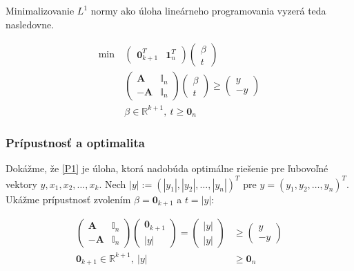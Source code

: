\documentclass[report.tex]{subfiles}
\begin{document}
Minimalizovanie $L^{1}$ normy ako úloha lineárneho programovania vyzerá teda nasledovne.

\begin{align}
	\text{min}~ &
	\left(
		\begin{array}{c|c}
			\mathbf{0}_{k+1}^T & \mathbf{1}_n^T
		\end{array}
	\right)
	\left(
		\begin{array}{c}
			\beta \\
			\hline
			t
		\end{array}
	\right) \nonumber \\
	&\left(
		\begin{array}{c|c}
			\mathbf{A} & \mathbb{I}_n \\
			\hline
			-\mathbf{A} & \mathbb{I}_n
		\end{array}
	\right)
	\left(
		\begin{array}{c}
			\beta \\
			\hline
			t
		\end{array}
	\right)
	\geq
	\left(
		\begin{array}{c}
			y \\
			\hline
			-y
		\end{array}
	\right) \label{P1} \\
	&\beta \in \mathbb{R}^{k+1},~t \geq \mathbf{0}_{n} \nonumber
\end{align}

\subsubsection{Prípustnosť a optimalita}\label{sec:1Optim}

Dokážme, že \eqref{P1} je úloha, ktorá nadobúda optimálne riešenie pre ľubovoľné vektory $y, x_1, x_2, \dots, x_k$. Nech $|y| := (|y_1|, |y_2|, \dots, |y_n|)^T$ pre $y = (y_1, y_2, \dots, y_n)^T$. Ukážme prípustnosť zvolením $\beta = \mathbf{0}_{k+1}$ a $t = |y|$:

\begin{align*}
	\left(
		\begin{array}{c|c}
			\mathbf{A} & \mathbb{I}_n \\
			\hline
			-\mathbf{A} & \mathbb{I}_n
		\end{array}
	\right)
	\left(
		\begin{array}{c}
			\mathbf{0}_{k+1} \\
			\hline
			|y|
		\end{array}
	\right)
	=
	\left(
		\begin{array}{c}
			|y| \\
			\hline
			|y|
		\end{array}
	\right)
	&\geq
	\left(
		\begin{array}{c}
			y \\
			\hline
			-y
		\end{array}
	\right) \\
	\mathbf{0}_{k+1} \in \mathbb{R}^{k+1},~|y| &\geq \mathbf{0}_{n} 
\end{align*}
\end{document}
